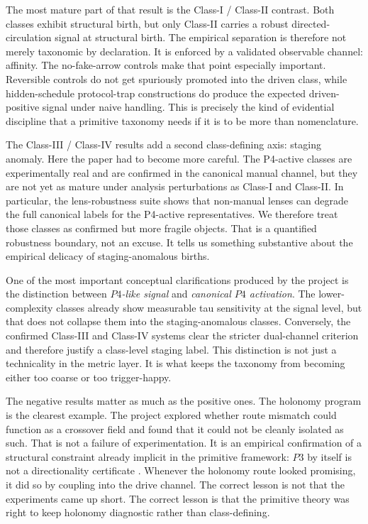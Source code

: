 \documentclass[11pt]{article}
\begin{document}
The most mature part of that result is the Class-I / Class-II contrast. Both classes exhibit structural birth, but only Class-II carries a robust directed-circulation signal at structural birth. The empirical separation is therefore not merely taxonomic by declaration. It is enforced by a validated observable channel: affinity. The no-fake-arrow controls make that point especially important. Reversible controls do not get spuriously promoted into the driven class, while hidden-schedule protocol-trap constructions do produce the expected driven-positive signal under naive handling. This is precisely the kind of evidential discipline that a primitive taxonomy needs if it is to be more than nomenclature.

The Class-III / Class-IV results add a second class-defining axis: staging anomaly. Here the paper had to become more careful. The P4-active classes are experimentally real and are confirmed in the canonical manual channel, but they are not yet as mature under analysis perturbations as Class-I and Class-II. In particular, the lens-robustness suite shows that non-manual lenses can degrade the full canonical labels for the P4-active representatives. We therefore treat those classes as confirmed but more fragile objects. That is a quantified robustness boundary, not an excuse. It tells us something substantive about the empirical delicacy of staging-anomalous births.

One of the most important conceptual clarifications produced by the project is the distinction between \emph{$P4$-like signal} and \emph{canonical $P4$ activation}. The lower-complexity classes already show measurable tau sensitivity at the signal level, but that does not collapse them into the staging-anomalous classes. Conversely, the confirmed Class-III and Class-IV systems clear the stricter dual-channel criterion and therefore justify a class-level staging label. This distinction is not just a technicality in the metric layer. It is what keeps the taxonomy from becoming either too coarse or too trigger-happy.

The negative results matter as much as the positive ones. The holonomy program is the clearest example. The project explored whether route mismatch could function as a crossover field and found that it could not be cleanly isolated as such. That is not a failure of experimentation. It is an empirical confirmation of a structural constraint already implicit in the primitive framework: $P3$ by itself is not a directionality certificate \cite{sixbirds_protocol_trap,liang_pigolotti_2023}. Whenever the holonomy route looked promising, it did so by coupling into the drive channel. The correct lesson is not that the experiments came up short. The correct lesson is that the primitive theory was right to keep holonomy diagnostic rather than class-defining.
\end{document}
